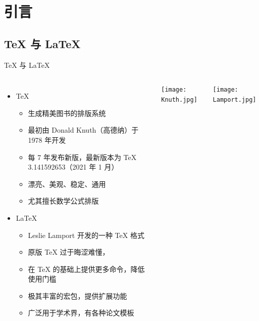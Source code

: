 \section{引言}

\subsection{\TeX{} 与 \LaTeX}

\begin{frame}[fragile]{\TeX{} 与 \LaTeX}
  \begin{columns}[T]
    \begin{itemize}
      \item \TeX{}
            \begin{itemize}
              \item 生成精美图书的排版系统
              \item 最初由 Donald Knuth（高德纳）于 1978 年开发
              \item 每 7 年发布新版，最新版本为 \TeX{} 3.141592653（2021 年 1 月）
              \item 漂亮、美观、稳定、通用
              \item 尤其擅长数学公式排版
            \end{itemize}
      \item \LaTeX{}
            \begin{itemize}
              \item Leslie Lamport 开发的一种 \TeX{} 格式
              \item 原版 \TeX{} 过于晦涩难懂，
              \item 在 \TeX{} 的基础上提供更多命令，降低使用门槛
              \item 极其丰富的宏包，提供扩展功能
              \item 广泛用于学术界，有各种论文模板
            \end{itemize}
    \end{itemize}
    \vspace*{5mm}
    \texttt{[image: Knuth.jpg]}

    \vspace*{5mm}
    \texttt{[image: Lamport.jpg]}

  \end{columns}
\end{frame}

